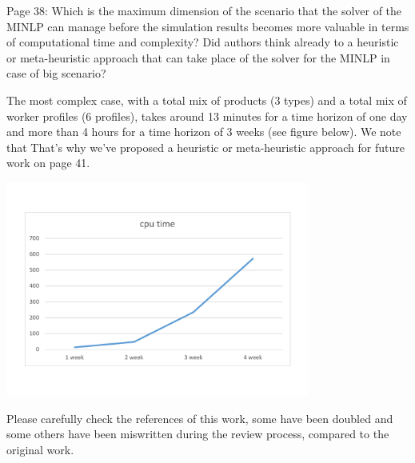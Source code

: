 \documentclass[preprint,11pt,3p]{elsarticle}
\begin{document}
\begin{tcolorbox}[colback=q_color1,colframe=q_color2,title=Q16  :] Page 38: Which is the maximum dimension of the scenario that the solver of the MINLP can manage before the simulation results becomes more valuable in terms of computational time and complexity? Did authors think already to a heuristic or meta-heuristic approach that can take place of the solver for the MINLP in case of big scenario?
\end{tcolorbox}
\begin{tcolorbox}[colback=r_color1,colframe=r_color2,title=R16:]
The most complex case, with a total mix of products (3 types) and a total mix of worker profiles (6 profiles), takes around 13 minutes for a time horizon of one day and more than 4 hours for a time horizon of 3 weeks (see figure below).
We note that 
That's why we've proposed a heuristic or meta-heuristic approach for future work on page 41.\\
\begin{center}
\includegraphics[trim=0 55 0 30,clip,width=10cm]{cpu time.pdf} 
\end{center}
\end{tcolorbox}
\begin{tcolorbox}[colback=q_color1,colframe=q_color2,title=Q17  :] Please carefully check the references of this work, some have been doubled and some others have been miswritten during the review process, compared to the original work.
\end{tcolorbox}
\end{document}
